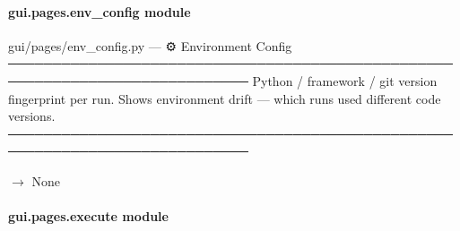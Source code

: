\documentclass[letterpaper,10pt,english]{sphinxmanual}
\begin{document}
\begin{fulllineitems}
\label{\detokenize{gui.pages.energy:gui.pages.energy.render}}
\pysigstartsignatures
\pysiglinewithargsret
{}
{}
{}
\pysigstopsignatures
\end{fulllineitems}


\sphinxstepscope


\paragraph{gui.pages.env\_config module}
\label{\detokenize{gui.pages.env_config:module-gui.pages.env_config}}\label{\detokenize{gui.pages.env_config:gui-pages-env-config-module}}\label{\detokenize{gui.pages.env_config::doc}}
\sphinxAtStartPar
gui/pages/env\_config.py  —  ⚙  Environment Config
─────────────────────────────────────────────────────────────────────────────
Python / framework / git version fingerprint per run.
Shows environment drift — which runs used different code versions.
─────────────────────────────────────────────────────────────────────────────

\begin{fulllineitems}
\label{\detokenize{gui.pages.env_config:gui.pages.env_config.render}}
\pysigstartsignatures
\pysiglinewithargsret
{}
{}
{{ $\rightarrow$ None}}
\pysigstopsignatures
\end{fulllineitems}


\sphinxstepscope


\paragraph{gui.pages.execute module}
\label{\detokenize{gui.pages.execute:module-gui.pages.execute}}\label{\detokenize{gui.pages.execute:gui-pages-execute-module}}\label{\detokenize{gui.pages.execute::doc}}
\end{document}
